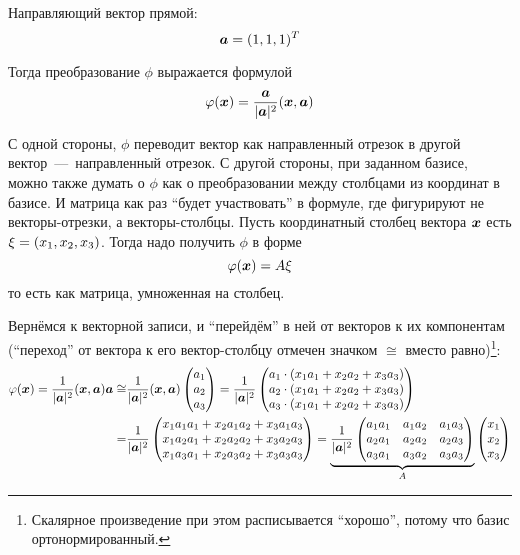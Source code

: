 \documentclass[a4paper,12pt]{article}
\begin{document}
  \begin{solution}
    Направляющий вектор прямой:
    \[
      \boldsymbol a = (1, 1, 1)^T
    \]
    
    Тогда преобразование $\phi$ выражается формулой
    \[
      \varphi(\boldsymbol x) = \frac{\boldsymbol a}{|\boldsymbol a|^2} (\boldsymbol x, \boldsymbol a)
    \]
    
    С одной стороны, $\phi$ переводит вектор как направленный отрезок в другой вектор~---~направленный отрезок.
    С другой стороны, при заданном базисе, можно также думать о $\phi$ как о преобразовании между столбцами из координат в базисе.
    И матрица как раз ``будет участвовать'' в формуле, где фигурируют не векторы-отрезки, а векторы-столбцы.
    Пусть координатный столбец вектора $\boldsymbol x$ есть $\xi \hm= (x_1, x_2, x_3)$.
    Тогда надо получить $\phi$ в форме
    \[
      \varphi(\boldsymbol x) = A \xi
    \]
    то есть как матрица, умноженная на столбец.
    
    Вернёмся к векторной записи, и ``перейдём'' в ней от векторов к их компонентам (``переход'' от вектора к его вектор-столбцу отмечен значком $\cong$ вместо равно)\footnote{Скалярное произведение при этом расписывается ``хорошо'', потому что базис ортонормированный.}:
    \begin{equation*}
    \begin{split}
      \varphi(\boldsymbol x)
      = \frac{1}{|\boldsymbol a|^2}(\boldsymbol x, \boldsymbol a) \boldsymbol a
      \cong &\frac{1}{|\boldsymbol a|^2} (\boldsymbol x, \boldsymbol a) \begin{pmatrix}
        a_1 \\ a_2 \\ a_3
      \end{pmatrix}
      = \frac{1}{|\boldsymbol a|^2} \begin{pmatrix}
        a_1 \cdot (x_1 a_1 + x_2 a_2 + x_3 a_3)\\
        a_2 \cdot (x_1 a_1 + x_2 a_2 + x_3 a_3)\\
        a_3 \cdot (x_1 a_1 + x_2 a_2 + x_3 a_3)
      \end{pmatrix}\\
      = &\frac{1}{|\boldsymbol a|^2} \begin{pmatrix}
        x_1 a_1a_1 + x_2 a_1a_2 + x_3 a_1a_3\\
        x_1 a_2a_1 + x_2 a_2a_2 + x_3 a_2a_3\\
        x_1 a_3a_1 + x_2 a_3a_2 + x_3 a_3a_3
      \end{pmatrix}
      = \underbrace{\frac{1}{|\boldsymbol a|^2} \begin{pmatrix}
        a_1a_1 & a_1a_2 & a_1a_3\\
        a_2a_1 & a_2a_2 & a_2a_3\\
        a_3a_1 & a_3a_2 & a_3a_3
      \end{pmatrix}}_{A} \begin{pmatrix}
        x_1 \\ x_2 \\ x_3
      \end{pmatrix}
    \end{split}
    \end{equation*}
  \end{solution}
\end{document}
